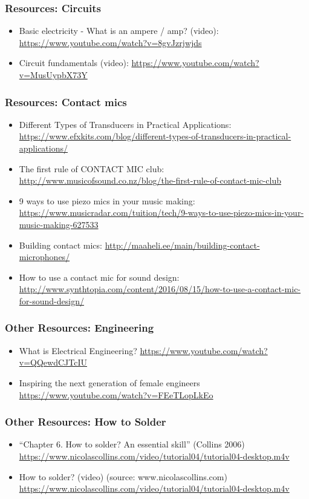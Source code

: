 \documentclass[screen, aspectratio=43]{beamer}
\begin{document}
\begin{frame}
  \frametitle{Resources: Circuits}
    \begin{itemize}
    \item Basic electricity - What is an ampere / amp? (video): \url{https://www.youtube.com/watch?v=8gvJzrjwjds}
    \item Circuit fundamentals (video): \url{https://www.youtube.com/watch?v=MusUypbX73Y}
    \end{itemize}    
\end{frame}
%
\begin{frame}
  \frametitle{Resources: Contact mics}
    \begin{itemize}
    	\item Different Types of Transducers in Practical Applications: \url{https://www.efxkits.com/blog/different-types-of-transducers-in-practical-applications/}
	\item The first rule of CONTACT MIC club: \url{http://www.musicofsound.co.nz/blog/the-first-rule-of-contact-mic-club}
	\item 9 ways to use piezo mics in your music making: \url{https://www.musicradar.com/tuition/tech/9-ways-to-use-piezo-mics-in-your-music-making-627533}
	\item Building contact mics: \url{http://maaheli.ee/main/building-contact-microphones/}
	\item How to use a contact mic for sound design: \url{http://www.synthtopia.com/content/2016/08/15/how-to-use-a-contact-mic-for-sound-design/}
    \end{itemize}    
\end{frame}
%
\begin{frame}
  \frametitle{Other Resources: Engineering}
    \begin{itemize}
    \item What is Electrical Engineering? \url{https://www.youtube.com/watch?v=QQewdCJTcIU}
    \item Inspiring the next generation of female engineers \url{https://www.youtube.com/watch?v=FEeTLopLkEo}
    \end{itemize}
\end{frame}
%
\begin{frame}
  \frametitle{Other Resources: How to Solder}
    \begin{itemize}
    \item ``Chapter 6. How to solder? An essential skill'' (Collins 2006)\\
    \url{https://www.nicolascollins.com/video/tutorial04/tutorial04-desktop.m4v}     
    \item How to solder? (video) (source: www.nicolascollins.com)\\
    \url{https://www.nicolascollins.com/video/tutorial04/tutorial04-desktop.m4v} 
    \end{itemize}
\end{frame}
\end{document}
